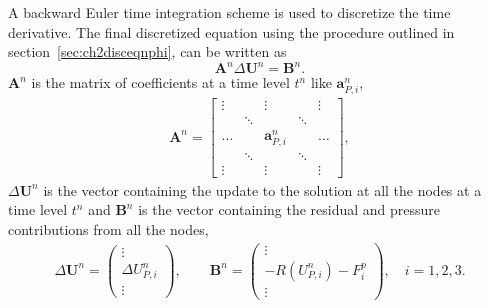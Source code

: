 A backward Euler time integration scheme is used to discretize the time derivative. The final discretized equation using the procedure outlined in section~\ref{sec:ch2disceqnphi}, can be written as
\begin{equation}
\boldsymbol{A}^n \Delta\mathbf{U}^n=\mathbf{B}^n.
\label{eq:momeqfinal}
\end{equation}
$\boldsymbol{A}^n$ is the matrix of coefficients at a time level $t^n$ like $\mathbf{a}_{P,i}^n$, 
\begin{align*}
\boldsymbol{A}^n = \begin{bmatrix}
\vdots & & \vdots  & & \vdots \\
 & \ddots & & \ddots  \\
\dots & & \mathbf{a}_{P,i}^n & & \dots\\
 & \ddots & & \ddots  \\
\vdots & & \vdots  & &\vdots
\end{bmatrix},
\end{align*}
$\Delta\mathbf{U}^n$ is the vector containing the update to the solution at all the nodes at a time level $t^n$ and $\mathbf{B}^n$ is the vector containing the residual and pressure contributions from all the nodes,
\begin{align*}
\Delta\mathbf{U}^n = \begin{pmatrix}
\vdots\\
\Delta U_{P,i}^n \\
\vdots
\end{pmatrix},
\qquad
\mathbf{B}^n = \begin{pmatrix}
\vdots \\
-R(U^{n}_{P,i})-F^{p}_i\\
\vdots
\end{pmatrix},
\quad
i=1,2,3.
\end{align*}


